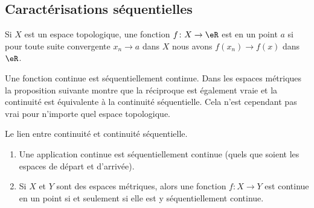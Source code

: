 \subsection{Caractérisations séquentielles}

\begin{definition}  \label{DefENioICV}
    Si \( X\) est un espace topologique, une fonction \( f\colon X\to \eR\) est  en un point \( a\) si pour toute suite convergente \( x_n\to a\) dans \( X\) nous avons \( f(x_n)\to f(x)\) dans \( \eR\).
\end{definition}


Une fonction continue est séquentiellement continue. Dans les espaces métriques la proposition suivante montre que la réciproque est également vraie et la continuité est équivalente à la continuité séquentielle. Cela n'est cependant pas vrai pour n'importe quel espace topologique.

\begin{proposition}		\label{PropFnContParSuite}
    Le lien entre continuité et continuité séquentielle.

    \begin{enumerate}
        \item
    Une application continue est séquentiellement continue (quels que soient les espaces de départ et d'arrivée).

\item\label{ItemWJHIooMdugfu}
    
    Si \( X\) et \( Y\) sont des espaces métriques, alors une fonction \( f\colon X\to Y\) est continue en un point si et seulement si elle est y séquentiellement continue.
    \end{enumerate}
\end{proposition}

